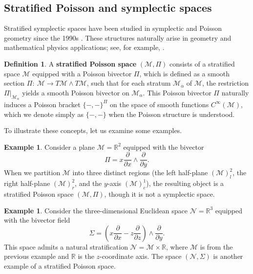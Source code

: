 \documentclass[12pt]{amsart}
\theoremstyle{definition}
\newtheorem{definition}[theorem]{Definition}
\newtheorem{example}[theorem]{Example}
\numberwithin{equation}{section}
\newcommand{\RR}{\mathbb{R}}
\newcommand{\Cinf}{C^\infty}
\newcommand{\PoissonBracket}[1]{\{#1\}}
\begin{document}
 	
	
	
	\subsection{Stratified   Poisson and symplectic spaces}  
	
	Stratified symplectic spaces have been  studied in symplectic and Poisson geometry since the 1990s \cite{BatesLerman1997, ChenRuan2001, Huebschmann2004, SLannals, Pflaumbook}. These structures naturally arise in geometry and mathematical physics applications;  see, for example,  \cite{Huebschmann2004, HuebschmannRudolphSchmidt2009, Karshon1992}.
	
	
	\begin{definition}\label{def:poissonsymlecticstratifiedspace}
\cite{Pflaumpaper,anotherpaper}
		A \textbf{stratified Poisson space} $(\mathcal{M},\Pi)$ consists of a stratified space $ \mathcal{M} $ equipped with a Poisson bivector $\Pi$, which is defined as a smooth section $\Pi:~\mathcal{M}\to T\mathcal{M}\wedge T\mathcal{M}$, such that for each stratum $\mathcal{M}_{\alpha}$   of $\mathcal{M}$, the restriction $\Pi|_{\mathcal{M}_{\alpha}}$ yields a smooth Poisson bivector on $\mathcal{M}_{\alpha}$. This Poisson bivector $\Pi$ naturally induces a Poisson bracket $\PoissonBracket{-,-}^{\Pi}$ on the space of smooth functions $\Cinf(\mathcal{M})$, which we denote simply as $\PoissonBracket{-,-}$ when the Poisson structure is understood. %
		
	\end{definition}
	To illustrate these concepts, let us examine some   examples. 
	
	\begin{example}\label{Example:demo}
		Consider a plane $\mathcal{M} =\RR^2$ equipped with the bivector $$\Pi= x \frac{\partial }{\partial x}\wedge \frac{\partial }{\partial y}.$$ When we partition $\mathcal{M} $ into three distinct regions (the left half-plane $(\mathcal{M})^2_l $, the right half-plane $(\mathcal{M})^2_r $, and the $y$-axis $(\mathcal{M})^1_c $), the resulting object is a stratified Poisson space $(\mathcal{M} ,\Pi)$, though   it is not a symplectic space.
		
		
	\end{example}
	\begin{example}
		\label{Example:demo2} 
		Consider the three-dimensional Euclidean space $\mathcal{N}=\RR^3$ equipped with the bivector field $$\Sigma= (x \frac{\partial }{\partial x}-z \frac{\partial }{\partial z})\wedge \frac{\partial }{\partial y}.$$ This space admits a natural stratification $\mathcal{N}=\mathcal{M}\times \RR$, where $\mathcal{M}$ is from the previous example and $\RR$ is the $z$-coordinate axis. The space $(\mathcal{N},\Sigma)$ is another example of a stratified Poisson space.
	
	\end{example}
\end{document}
